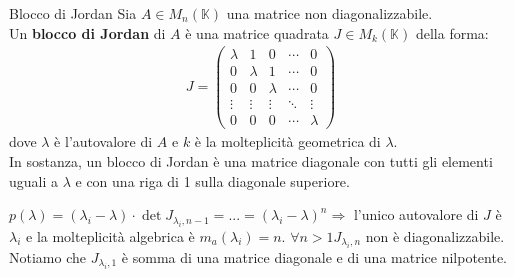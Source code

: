 \documentclass[a4paper]{article}
\theoremstyle{definition}
\begin{document}
	\begin{deff}{Blocco di Jordan}{}
		Sia $A \in M_n(\mathbb{K})$ una matrice non diagonalizzabile. \\
		Un \textbf{blocco di Jordan} di $A$ è una matrice quadrata $J \in M_k(\mathbb{K})$ della forma:
		\begin{align*}
			J = \begin{pmatrix}
				\lambda & 1 & 0 & \cdots & 0 \\
				0 & \lambda & 1 & \cdots & 0 \\
				0 & 0 & \lambda & \cdots & 0 \\
				\vdots & \vdots & \vdots & \ddots & \vdots \\
				0 & 0 & 0 & \cdots & \lambda
			\end{pmatrix}
		\end{align*}
		dove $\lambda$ è l'autovalore di $A$ e $k$ è la molteplicità geometrica di $\lambda$. \\
		In sostanza, un blocco di Jordan è una matrice diagonale con tutti gli elementi uguali a $\lambda$ e con una riga di 1 sulla diagonale superiore.
	\end{deff}
	$p(\lambda) = (\lambda _i - \lambda) \cdot \det J_{\lambda_i,n-1} = ... = (\lambda_i - \lambda)^n \Rightarrow$ l'unico autovalore di $J$ è $\lambda_i$
	e la molteplicità algebrica è $m_a(\lambda_i) = n$.
	$\forall n > 1 J_{\lambda_i,n}$ non è diagonalizzabile. Notiamo che $J_{\lambda_i,1}$ è somma di una matrice diagonale e di una matrice nilpotente.
\end{document}
